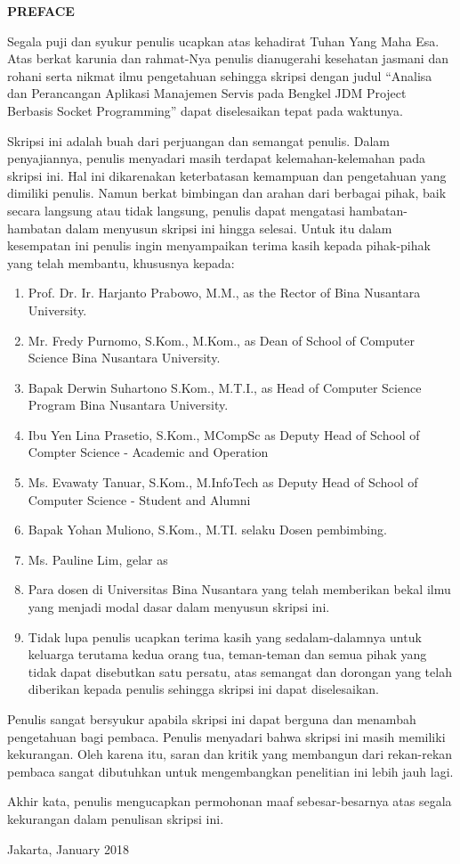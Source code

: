 \renewcommand{\baselinestretch}{1.5}\normalsize

\begingroup
\begin{center}
\fontsize{16pt}{12pt}\selectfont
\textbf{PREFACE}
\end{center}
\endgroup
\justify
\tab Segala puji dan syukur penulis ucapkan atas kehadirat Tuhan Yang Maha Esa. Atas berkat karunia dan rahmat-Nya penulis dianugerahi kesehatan jasmani dan rohani serta nikmat ilmu pengetahuan sehingga skripsi dengan judul “Analisa dan Perancangan Aplikasi Manajemen Servis pada Bengkel JDM Project Berbasis Socket Programming” dapat diselesaikan tepat pada waktunya.

\tab Skripsi ini adalah buah dari perjuangan dan semangat penulis. Dalam penyajiannya, penulis menyadari masih terdapat kelemahan-kelemahan pada skripsi ini. Hal ini dikarenakan keterbatasan kemampuan dan pengetahuan yang dimiliki penulis. Namun berkat bimbingan dan arahan dari berbagai pihak, baik secara langsung atau tidak langsung, penulis dapat mengatasi hambatan-hambatan dalam menyusun skripsi ini hingga selesai. Untuk itu dalam kesempatan ini penulis ingin menyampaikan terima kasih kepada pihak-pihak yang telah membantu, khususnya kepada:

\begin{enumerate}
\itemsep0em
\item Prof. Dr. Ir. Harjanto Prabowo, M.M., as the Rector of Bina Nusantara University.
\item Mr. Fredy Purnomo, S.Kom., M.Kom., as Dean of School of Computer Science Bina Nusantara University.
\item Bapak Derwin Suhartono S.Kom., M.T.I., as Head of Computer Science Program Bina Nusantara University.
\item Ibu Yen Lina Prasetio, S.Kom., MCompSc as Deputy Head of School of Compter Science - Academic and Operation
\item Ms. Evawaty Tanuar, S.Kom., M.InfoTech as Deputy Head of School of Computer Science - Student and Alumni
\item Bapak Yohan Muliono, S.Kom., M.TI. selaku Dosen pembimbing.
\item Ms. Pauline Lim, gelar as
\item Para dosen di Universitas Bina Nusantara yang telah memberikan bekal ilmu yang menjadi modal dasar dalam menyusun skripsi ini.
\item Tidak lupa penulis ucapkan terima kasih yang sedalam-dalamnya untuk keluarga terutama kedua orang tua, teman-teman dan semua pihak yang tidak dapat disebutkan satu persatu, atas semangat dan dorongan yang telah diberikan kepada penulis sehingga skripsi ini dapat diselesaikan.
\end{enumerate}
Penulis sangat bersyukur apabila skripsi ini dapat berguna dan menambah pengetahuan bagi pembaca. Penulis menyadari bahwa skripsi ini masih memiliki kekurangan. Oleh karena itu, saran dan kritik yang membangun dari rekan-rekan pembaca sangat dibutuhkan untuk mengembangkan penelitian ini lebih jauh lagi.

Akhir kata, penulis mengucapkan permohonan maaf sebesar-besarnya atas segala kekurangan dalam penulisan skripsi ini.

\begin{flushright}
Jakarta, January 2018
\end{flushright}